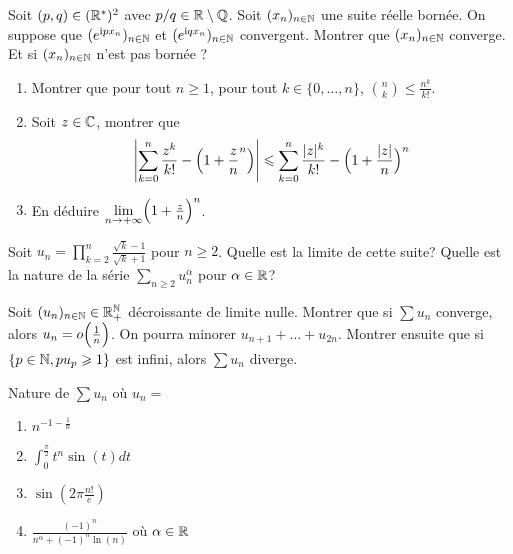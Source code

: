 \begin{exercise}
	Soit $(p,q)\in(\mathbb{R}^{*})^{2}$ avec $p/q\in\mathbb{R}\setminus\mathbb{Q}$. Soit
	$(x_{n})_{n\in\mathbb{N}}$ une suite réelle bornée. On suppose que
	$(e^{\mathrm{i}px_{n}})_{n\in\mathbb{N}}$ et $(e^{\mathrm{i}qx_{n}})_{n\in\mathbb{N}}$
	convergent. Montrer que $(x_{n})_{n\in\mathbb{N}}$ converge. Et si $(x_{n})_{n\in\mathbb{N}}$
	n'est pas bornée ?
\end{exercise}

\begin{exercise}
	\phantom{}
	\begin{enumerate}
		\item
		Montrer que pour tout $n\geqslant1$, pour tout $k\in\{0,\dots,n\}$,
		$\binom{n}{k}\leqslant\frac{n^{k}}{k!}$.
		\item
		Soit $z\in\mathbb{C}$, montrer que 
		$$\Biggl\vert\sum_{k=0}^{n}\frac{z^{k}}{k!}-\Bigl(1+\frac{z}{n}^{n}\Bigr)\Biggr\vert\leqslant\sum_{k=0}^{n}\frac{\vert
		z\vert^{k}}{k!}-\Bigl(1+\frac{\vert z\vert}{n}\Bigr)^{n}$$
		\item
		En déduire $\lim\limits_{n\to+\infty}\Bigl(1+\frac{z}{n}\Bigr)^{n}$.
	\end{enumerate}
\end{exercise}

\begin{exercise}
	Soit $u_{n}=\prod_{k=2}^{n}\frac{\sqrt{k}-1}{\sqrt{k}+1}$ pour $n\geqslant 2$.
	Quelle est la limite de cette suite? Quelle est la nature de la série
	$\sum_{n\geqslant 2}u_{n}^{\alpha}$ pour $\alpha\in\mathbb{R}$?
\end{exercise}

\begin{exercise}
	Soit $(u_{n})_{n\in\mathbb{N}}\in\mathbb{R}_{+}^{\mathbb{N}}$ décroissante de limite nulle. Montrer
	que si $\sum u_{n}$ converge, alors $u_{n}=o\Bigl(\frac{1}{n}\Bigr)$. On
	pourra minorer $u_{n+1}+\dots+u_{2n}$. Montrer ensuite que si $\{p\in\mathbb{N},
	pu_{p}\geqslant1\}$ est infini, alors $\sum u_{n}$ diverge.
\end{exercise}

\begin{exercise}
	Nature de $\sum u_{n}$ où $u_{n}=$
	\begin{enumerate}
		\item
		$n^{-1-\frac{1}{n}}$
		\item
		$\int_{0}^{\frac{\pi}{2}}t^{n}\sin(t)dt$
		\item
		$\sin(2\pi\frac{n!}{e})$
		\item
		$\frac{(-1)^{n}}{n^{\alpha}+(-1)^{n}\ln(n)}$ où $\alpha\in\mathbb{R}$
	\end{enumerate}
\end{exercise}

